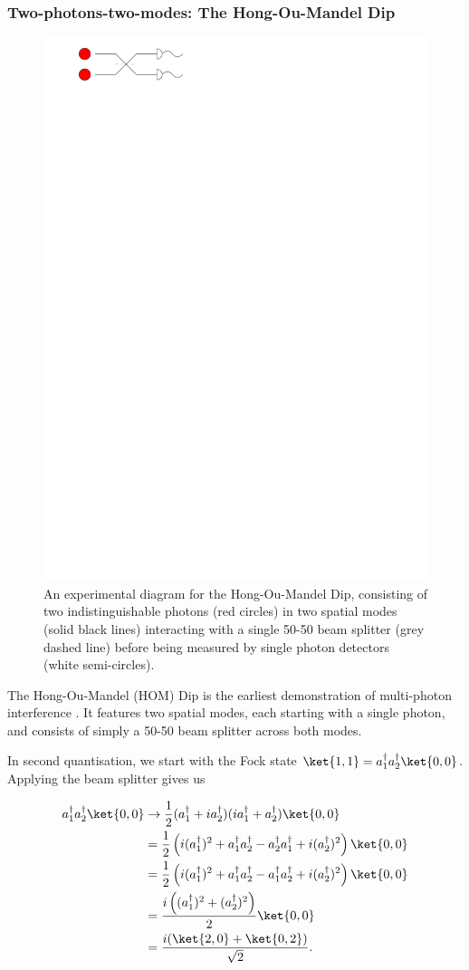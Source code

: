 \subsubsection{Two-photons-two-modes: The Hong-Ou-Mandel Dip}

\begin{figure}
\begin{center}
\includegraphics[width=0.45\linewidth]{preliminary_bs/hom}
\end{center}
\caption[Experimental setup of the Hong-Ou-Mandel Dip]{\label{fig:hom}An experimental diagram for the Hong-Ou-Mandel Dip, consisting of two indistinguishable photons (red circles) in two spatial modes (solid black lines) interacting with a single 50-50 beam splitter (grey dashed line) before being measured by single photon detectors (white semi-circles).}
\end{figure}

The Hong-Ou-Mandel (HOM) Dip is the earliest demonstration of multi-photon interference \cite{hong1987}. It features two spatial modes, each starting with a single photon, and consists of simply a 50-50 beam splitter across both modes.

In second quantisation, we start with the Fock state $\ket{1,1} = a_1^\dagger a_2^\dagger\ket{0,0}$. Applying the beam splitter gives us

\begin{align}
a_1^\dagger a_2^\dagger\ket{0,0} &\rightarrow \frac{1}{2}(a_1^\dagger+ia_2^\dagger)(ia_1^\dagger+a_2^\dagger)\ket{0,0}\\
&= \frac{1}{2}\left(i(a_1^\dagger)^2+a_1^\dagger a_2^\dagger-a_2^\dagger a_1^\dagger+i(a_2^\dagger)^2\right)\ket{0,0}\\
&= \frac{1}{2}\left(i(a_1^\dagger)^2+a_1^\dagger a_2^\dagger-a_1^\dagger a_2^\dagger+i(a_2^\dagger)^2\right)\ket{0,0}\\
&= \frac{i\left((a_1^\dagger)^2+(a_2^\dagger)^2\right)}{2}\ket{0,0}\\
&= \frac{i(\ket{2,0} + \ket{0,2})}{\sqrt{2}}.
\end{align}

